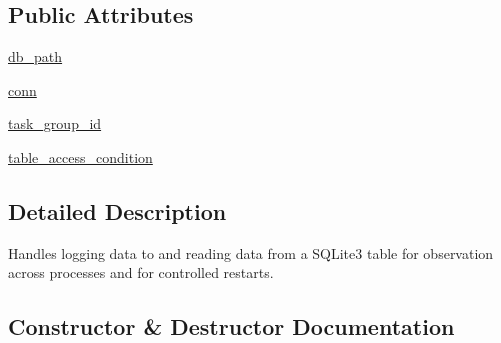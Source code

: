 \subsection*{Public Attributes}
\begin{DoxyCompactItemize}
\item 
\hyperlink{classparlai_1_1mturk_1_1core_1_1dev_1_1mturk__data__handler_1_1MTurkDataHandler_a7cca153268ab042892a68ad4aa032414}{db\+\_\+path}
\item 
\hyperlink{classparlai_1_1mturk_1_1core_1_1dev_1_1mturk__data__handler_1_1MTurkDataHandler_a66361d334cabae5782ca8a8740b32e95}{conn}
\item 
\hyperlink{classparlai_1_1mturk_1_1core_1_1dev_1_1mturk__data__handler_1_1MTurkDataHandler_af4bebaca067ce2d388fe76ee8859e1bd}{task\+\_\+group\+\_\+id}
\item 
\hyperlink{classparlai_1_1mturk_1_1core_1_1dev_1_1mturk__data__handler_1_1MTurkDataHandler_a782fb3d819b27356b34060bc3b9f110e}{table\+\_\+access\+\_\+condition}
\end{DoxyCompactItemize}


\subsection{Detailed Description}
\begin{DoxyVerb}Handles logging data to and reading data from a SQLite3 table for observation across
processes and for controlled restarts.
\end{DoxyVerb}
 

\subsection{Constructor \& Destructor Documentation}
\mbox{\label{classparlai_1_1mturk_1_1core_1_1dev_1_1mturk__data__handler_1_1MTurkDataHandler_ac6706c58fc7fc4f76a8d92e55c4d64df}} 
